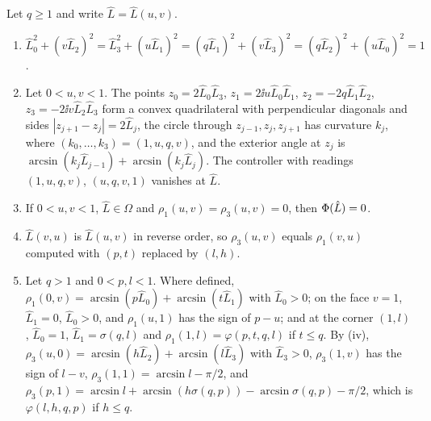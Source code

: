 \begin{lemma}\label{lem:core}
Let $q\ge1$ and write $\hat L=\hat L(u,v)$.
\begin{enumerate}[label=\textup{(\roman*)}]
\item $\hat L_0^2+(v\hat L_2)^2=\hat L_3^2+(u\hat L_1)^2=(q\hat L_1)^2+(v\hat L_3)^2
  =(q\hat L_2)^2+(u\hat L_0)^2=1$.
\item Let $0<u,v<1$. The points $z_0=2\hat L_0\hat L_3$,
  $z_1=2\ii u\hat L_0\hat L_1$, $z_2=-2q\hat L_1\hat L_2$,
  $z_3=-2\ii v\hat L_2\hat L_3$ form a convex quadrilateral with perpendicular
  diagonals and sides $|z_{j+1}-z_j|=2\hat L_j$, the circle through
  $z_{j-1},z_j,z_{j+1}$ has curvature $k_j$, where $(k_0,\dots,k_3)=(1,u,q,v)$,
  and the exterior angle at $z_j$ is
  $\arcsin(k_j\hat L_{j-1})+\arcsin(k_j\hat L_j)$. The controller with readings
  $(1,u,q,v)$, $(u,q,v,1)$ vanishes at $\hat L$.
\item If $0<u,v<1$, $\hat L\in\Omega$ and $\rho_1(u,v)=\rho_3(u,v)=0$, then
  $\Phi(\hat L)=0$.
\item $\hat L(v,u)$ is $\hat L(u,v)$ in reverse order, so $\rho_3(u,v)$ equals
  $\rho_1(v,u)$ computed with $(p,t)$ replaced by $(l,h)$.
\item Let $q>1$ and $0<p,l<1$. Where defined,
  $\rho_1(0,v)=\arcsin(p\hat L_0)+\arcsin(t\hat L_1)$ with $\hat L_0>0$; on the
  face $v=1$, $\hat L_1=0$, $\hat L_0>0$, and $\rho_1(u,1)$ has the sign of
  $p-u$; and at the corner $(1,l)$, $\hat L_0=1$, $\hat L_1=\sigma(q,l)$ and
  $\rho_1(1,l)=\varphi(p,t,q,l)$ if $t\le q$. By \textup{(iv)},
  $\rho_3(u,0)=\arcsin(h\hat L_2)+\arcsin(l\hat L_3)$ with $\hat L_3>0$,
  $\rho_3(1,v)$ has the sign of $l-v$, $\rho_3(1,1)=\arcsin l-\pi/2$, and
  $\rho_3(p,1)=\arcsin l+\arcsin(h\sigma(q,p))-\arcsin\sigma(q,p)-\pi/2$, which
  is $\varphi(l,h,q,p)$ if $h\le q$.
\end{enumerate}
\end{lemma}

